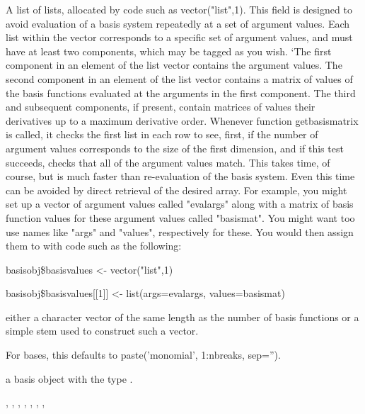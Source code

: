 \documentclass{article}
\begin{document}
\begin{Arguments}
\begin{ldescription}
\item[\code{basisvalues}] A list of lists, allocated by code such as vector("list",1).  This
field is designed to avoid evaluation of a basis system repeatedly
at a set of argument values.  Each list within the vector
corresponds to a specific set of argument values, and must have at
least two components, which may be tagged as you wish.  `The first
component in an element of the list vector contains the argument
values.  The second component in an element of the list vector
contains a matrix of values of the basis functions evaluated at the
arguments in the first component.  The third and subsequent
components, if present, contain matrices of values their derivatives
up to a maximum derivative order.  Whenever function getbasismatrix
is called, it checks the first list in each row to see, first, if
the number of argument values corresponds to the size of the first
dimension, and if this test succeeds, checks that all of the
argument values match.  This takes time, of course, but is much
faster than re-evaluation of the basis system.  Even this time can
be avoided by direct retrieval of the desired array.  For example,
you might set up a vector of argument values called "evalargs" along
with a matrix of basis function values for these argument values
called "basismat".  You might want too use names like "args" and
"values", respectively for these.  You would then assign them to
 with code such as the following:

basisobj\$basisvalues <- vector("list",1)

basisobj\$basisvalues[[1]] <- list(args=evalargs,
values=basismat)

\item[\code{names}] either a character vector of the same length as the number of basis
functions or a simple stem used to construct such a vector.

For  bases, this defaults to paste('monomial',
1:nbreaks, sep='').

\end{ldescription}
\end{Arguments}
\begin{Value}
a basis object with the type .
\end{Value}
\begin{SeeAlso}\relax
{},
,
,
,
,
,
,
\end{SeeAlso}
\end{document}
